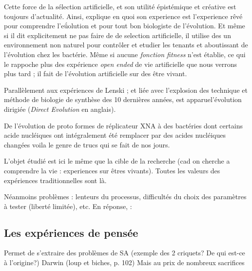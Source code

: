 Cette force de la sélection artificielle, et son utilité épistémique et créative est toujours d'actualité.
Ainsi, \cite{lenski94dynamicsadaptationdiversification10000generationexperimentbacterialpopulations} explique en quoi son experience est l'experience rêvé pour comprendre l'eǘolution et pour tout bon biologiste de l'évolution. Et même si il dit explicitement ne pas faire de de selection artificielle, il utilise des un environnement non naturel pour contrôler et etudier les tenants et aboutissant de l'évolution chez les bactérie. Même si aucune \emph{fonction fitness} n'est établie, ce qui le rappoche plus des expérience \emph{open ended} de vie artificielle que nous verrons plus tard ; il fait de l'évolution artificielle sur des être vivant.

Parallèlement aux expériences de Lenski ; et liée avec l'explosion des technique et méthode de biologie de synthèse des 10 dernières années, est apparuel'évolution dirigiée (\emph{Direct Evolution} en anglais)\cite{romero09exploringproteinfitnesslandscapesbydirectedevolution}.

De l'évolution de proto formes de réplicateur XNA à des bactéries dont certains acide nucléiques ont intégralement été remplacer par des acides nucléiques   changées voila le genre de trucs qui se fait de nos jours.


\citet{lenski94dynamicsadaptationdiversification10000generationexperimentbacterialpopulations,elena03evolutionexperimentsmicroorganismsdynamicsgeneticbasesadaptation,pinheiro12xnaworldprogresstowardsreplicationevolutionsyntheticgeneticpolymers,pinheiro12syntheticgeneticpolymerscapableheredityevolution}

L'objet étudié est ici le même que la cible de la recherche (cad on cherche a comprendre la vie : experiences sur êtres vivants). Toutes les valeurs des expériences traditionnelles sont là.

Néanmoins problèmes : lenteurs du processus, difficultés du choix des paramètres à tester (liberté limitée), etc.
En réponse, :

\subsection{Les expériences de pensée}\label{sec:cmpdr:te}
Permet de s'extraire des problèmes de SA 
\citet{dennett95darwinsdangerousideaevolutionmeaningslife}
\citet{sterelny99sexdeathintroductiontophilosophybiology}(exemple des 2 criquets? De qui est-ce à l'origine?)
Darwin (loup et biches, p. 102)
Mais au prix de nombreux sacrifices \cite[ch. I]{wilson1999biological}


